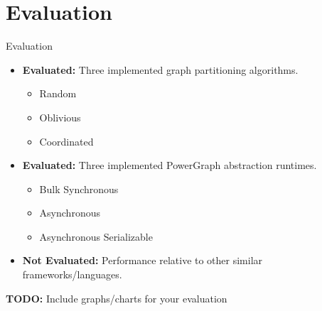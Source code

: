 \section{Evaluation}

\begin{frame}{Evaluation}
  \begin{itemize}
    \item \textbf{Evaluated:} Three implemented graph partitioning algorithms.
          \begin{itemize}
            \item Random
            \item Oblivious
            \item Coordinated
          \end{itemize}
    \item \textbf{Evaluated:} Three implemented PowerGraph abstraction runtimes.
          \begin{itemize}
            \item{Bulk Synchronous}
            \item{Asynchronous}
            \item{Asynchronous Serializable}
          \end{itemize}
    \item \textbf{Not Evaluated:} Performance relative to other similar
          frameworks/languages.
  \end{itemize}
\end{frame}

\begin{frame}
  \textbf{TODO:} Include graphs/charts for your evaluation
\end{frame}
